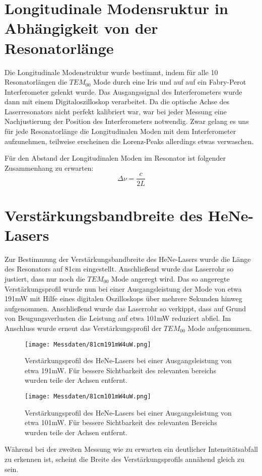 \documentclass[bigchapter,colorback,accentcolor=tud4b,linedtoc,11pt]{tudreport}
\numberwithin{equation}{subsection}
\begin{document}
\FloatBarrier
\section{Longitudinale Modensruktur in Abhängigkeit von der Resonatorlänge}
Die Longitudinale Modenstruktur wurde bestimmt, indem für alle 10 Resonatorlängen die $TEM_{00}$ Mode durch eine Iris und auf auf ein Fabry-Perot Interferometer gelenkt wurde. Das Ausgangssignal des Interferometers wurde dann mit einem Digitaloszilloskop verarbeitet.
Da die optische Achse des Laserresonators nicht perfekt kalibriert war, war bei jeder Messung eine Nachjustierung der Position des Interferometers notwendig. Zwar gelang es uns für jede Resonatorlänge die Longitudinalen Moden mit dem Interferometer aufzunehmen, teilweise erscheinen die Lorenz-Peaks allerdings etwas verwaschen.

Für den Abstand der Longitudinalen Moden im Resonator ist folgender Zusammenhang zu erwarten:
$$\Delta\nu=\frac{c}{2L}$$
\FloatBarrier
\newpage
\section{Verstärkungsbandbreite des HeNe-Lasers}
Zur Bestimmung der Verstärkungsbandbreite des HeNe-Lasers wurde die Länge des Resonators auf 81cm eingestellt. Anschließend wurde das Laserrohr so justiert, dass nur noch die $TEM_{00}$ Mode angeregt wird. Das so angeregte Verstärkungsprofil wurde nun bei einer Ausgangsleistung der Mode von etwa 191mW mit Hilfe eines digitalen Oszilloskops über mehrere Sekunden hinweg aufgenommen. Anschließend wurde das Laserrohr so verkippt, dass auf Grund von Beugungsverlusten die Leistung auf etwa 101mW reduziert abfiel. Im Anschluss wurde erneut das Verstärkungsprofil der $TEM_{00}$ Mode aufgenommen.

\begin{figure}[ht!]
\centering
\texttt{[image: Messdaten/81cm191mW4uW.png]}
\caption{Verstärkungsprofil des HeNe-Lasers bei einer Ausgangsleistung von etwa 191mW. Für bessere Sichtbarkeit des relevanten bereichs wurden teile der Achsen entfernt.}
\label{HeNeBreite191mW}
\end{figure}
\begin{figure}[ht!]
\centering
\texttt{[image: Messdaten/81cm101mW4uW.png]}
\caption{Verstärkungsprofil des HeNe-Lasers bei einer Ausgangsleistung von etwa 101mW. Für bessere Sichtbarkeit des relevanten Bereichs wurden teile der Achsen entfernt.}
\label{HeNeBreite101mW}
\end{figure}
\FloatBarrier
Während bei der zweiten Messung wie zu erwarten ein deutlicher Intensitätsabfall zu erkennen ist, scheint die Breite des Verstärkungsprofils annähend gleich zu sein.
\end{document}
